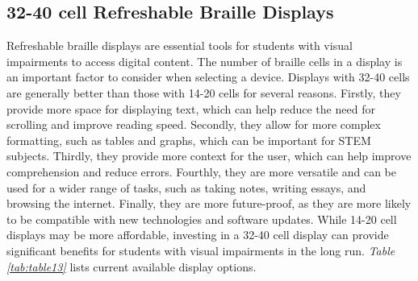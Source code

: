 \pagebreak
\hypertarget{cell-refreshable-braille-displays}{}\subsection{32-40 cell Refreshable Braille
 Displays}\label{cell-refreshable-braille-displays}
Refreshable braille displays are essential tools for students with visual impairments to access digital content. The number of braille cells in a display is an important factor to consider when selecting a device. Displays with 32-40 cells are generally better than those with 14-20 cells for several reasons. Firstly, they provide more space for displaying text, which can help reduce the need for scrolling and improve reading speed. Secondly, they allow for more complex formatting, such as tables and graphs, which can be important for STEM subjects. Thirdly, they provide more context for the user, which can help improve comprehension and reduce errors. Fourthly, they are more versatile and can be used for a wider range of tasks, such as taking notes, writing essays, and browsing the internet. Finally, they are more future-proof, as they are more likely to be compatible with new technologies and software updates. While 14-20 cell displays may be more affordable, investing in a 32-40 cell display can provide significant benefits for students with visual impairments in the long run. \textit{Table \ref{tab:table13}} lists current available display options.

